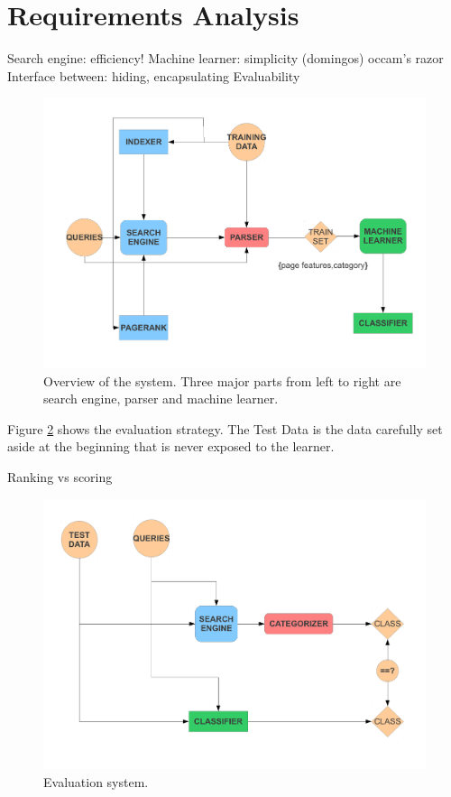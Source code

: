 \documentclass[12pt,twoside,notitlepage]{report}
\begin{document}
\section{Requirements Analysis}
Search engine: efficiency!
Machine learner: simplicity (domingos) occam's razor
Interface between: hiding, encapsulating
Evaluability
\begin{figure}
\centering
\includegraphics[scale=0.5]{figs/overview.pdf}
\caption{Overview of the system. Three major parts from left to right are search engine,
parser and machine learner.}
\label{overview}
\end{figure}

Figure \ref{eval} shows the evaluation strategy. The Test Data is the data
carefully set aside at the beginning that is never exposed to the learner. 

Ranking vs scoring 
\begin{figure}
\centering
\includegraphics[scale=0.5]{figs/eval.pdf}
\caption{Evaluation system. }
\label{eval}
\end{figure}
\end{document}
